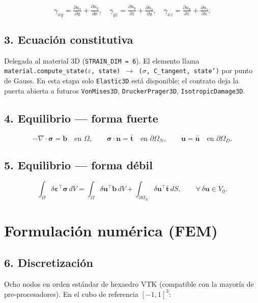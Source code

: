 \documentclass[11pt,letterpaper,oneside]{report}
\begin{document}
\[
\gamma_{xy} = \tfrac{\partial u_x}{\partial y} + \tfrac{\partial u_y}{\partial x},\quad \gamma_{yz} = \tfrac{\partial u_y}{\partial z} + \tfrac{\partial u_z}{\partial y},\quad \gamma_{xz} = \tfrac{\partial u_x}{\partial z} + \tfrac{\partial u_z}{\partial x}.
\]

\subsection{3. Ecuación constitutiva}

Delegada al material 3D (\texttt{STRAIN\_DIM = 6}). El elemento llama \texttt{material.compute\_state(\ensuremath{\varepsilon}, state) \ensuremath{\to} (\ensuremath{\sigma}, C\_tangent, state')} por punto de Gauss. En esta etapa solo \texttt{Elastic3D} está disponible; el contrato deja la puerta abierta a futuros \texttt{VonMises3D}, \texttt{DruckerPrager3D}, \texttt{IsotropicDamage3D}.

\subsection{4. Equilibrio --- forma fuerte}

\[
-\nabla\cdot\boldsymbol\sigma = \mathbf b \quad \text{en } \Omega, \qquad \boldsymbol\sigma\cdot\mathbf n = \bar{\mathbf t} \quad \text{en } \partial\Omega_N, \qquad \mathbf u = \bar{\mathbf u} \quad \text{en } \partial\Omega_D.
\]

\subsection{5. Equilibrio --- forma débil}

\[
\int_\Omega \delta\boldsymbol\varepsilon^\top \boldsymbol\sigma\, dV = \int_\Omega \delta\mathbf u^\top \mathbf b\, dV + \int_{\partial\Omega_N} \delta\mathbf u^\top \bar{\mathbf t}\, dS, \qquad \forall\, \delta\mathbf u \in V_0.
\]


\section{Formulación numérica (FEM)}

\subsection{6. Discretización}

Ocho nodos en orden estándar de hexaedro VTK (compatible con la mayoría de pre-procesadores). En el cubo de referencia $[-1, 1]^3$:
\end{document}
